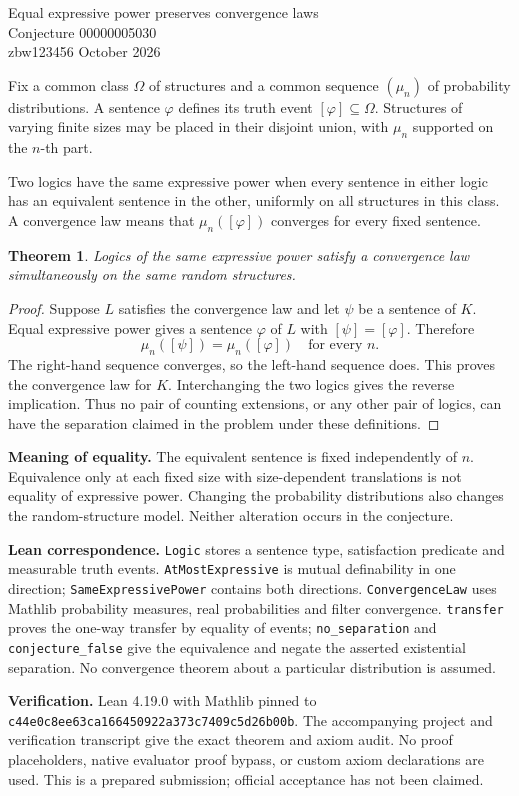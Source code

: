 \documentclass[11pt]{article}
\newtheorem{theorem}{Theorem}
\begin{document}
\begin{center}{\Large Equal expressive power preserves convergence laws}\\[5pt]{\large Conjecture 00000005030}\\[5pt]zbw123456  October 2026\end{center}

Fix a common class $\Omega$ of structures and a common sequence $(\mu_n)$ of probability distributions. A sentence $\varphi$ defines its truth event $[\varphi]\subseteq\Omega$. Structures of varying finite sizes may be placed in their disjoint union, with $\mu_n$ supported on the $n$-th part.

Two logics have the same expressive power when every sentence in either logic has an equivalent sentence in the other, uniformly on all structures in this class. A convergence law means that $\mu_n([\varphi])$ converges for every fixed sentence.
\begin{theorem}
Logics of the same expressive power satisfy a convergence law simultaneously on the same random structures.
\end{theorem}
\begin{proof}
Suppose $L$ satisfies the convergence law and let $\psi$ be a sentence of $K$. Equal expressive power gives a sentence $\varphi$ of $L$ with $[\psi]=[\varphi]$. Therefore
\[
\mu_n([\psi])=\mu_n([\varphi])\quad\text{for every }n.
\]
The right-hand sequence converges, so the left-hand sequence does. This proves the convergence law for $K$. Interchanging the two logics gives the reverse implication. Thus no pair of counting extensions, or any other pair of logics, can have the separation claimed in the problem under these definitions.
\end{proof}
\textbf{Meaning of equality.} The equivalent sentence is fixed independently of $n$. Equivalence only at each fixed size with size-dependent translations is not equality of expressive power. Changing the probability distributions also changes the random-structure model. Neither alteration occurs in the conjecture.

\textbf{Lean correspondence.} \texttt{Logic} stores a sentence type, satisfaction predicate and measurable truth events. \texttt{AtMostExpressive} is mutual definability in one direction; \texttt{SameExpressivePower} contains both directions. \texttt{ConvergenceLaw} uses Mathlib probability measures, real probabilities and filter convergence. \texttt{transfer} proves the one-way transfer by equality of events; \texttt{no\_separation} and \texttt{conjecture\_false} give the equivalence and negate the asserted existential separation. No convergence theorem about a particular distribution is assumed.


\textbf{Verification.} Lean 4.19.0 with Mathlib pinned to
\texttt{c44e0c8ee63ca166450922a373c7409c5d26b00b}.
The accompanying project and verification transcript give the exact theorem and axiom audit. No proof placeholders, native evaluator proof bypass, or custom axiom declarations are used. This is a prepared submission; official acceptance has not been claimed.
\end{document}
